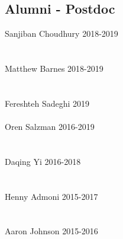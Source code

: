\subsection{Alumni - Postdoc}
\vspace{-1em}
\noindent
Sanjiban Choudhury \hfill 2018-2019\\
\\
\\
Matthew Barnes \hfill 2018-2019\\
\\
\\
Fereshteh Sadeghi \hfill 2019\\
\\
Oren Salzman \hfill 2016-2019\\
\\
\\
Daqing Yi \hfill 2016-2018\\
\\
\\
Henny Admoni \hfill 2015-2017\\
\\
\\
Aaron Johnson \hfill 2015-2016\\
\\


